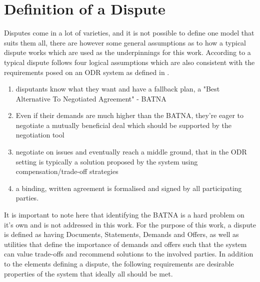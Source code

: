 \documentclass[12pt,msc,a4paper,oneside]{ucl_thesis}
\begin{document}
\section{Definition of a Dispute}
Disputes come in a lot of varieties, and it is not possible to define one model that suits them all, there are however some general assumptions as to how a typical dispute works which are used as the underpinnings for this work. According to \cite{Susskind:Logic_of_mediating_values} a typical dispute follows four logical assumptions which are also consistent with the requirements posed on an ODR system as defined in \cite{Lodder:ORD_system_design}.
\begin{enumerate}
    \item{disputants know what they want and have a fallback plan, a "Best Alternative To Negotiated Agreement" - BATNA}
    \item{Even if their demands are much higher than the BATNA, they're eager to negotiate a mutually beneficial deal which should be supported by the negotiation tool}
    \item{negotiate on issues and eventually reach a middle ground, that in the ODR setting is typically a solution proposed by the system using compensation/trade-off strategies}
    \item{a binding, written agreement is formalised and signed by all participating parties.}
\end{enumerate}
It is important to note here that identifying the BATNA is a hard problem on it's own and is not addressed in this work. For the purpose of this work, a dispute is defined as having Documents, Statements, Demands and Offers, as well as utilities that define the importance of demands and offers such that the system can value trade-offs and recommend solutions to the involved parties. In addition to the elements defining a dispute, the following requirements are desirable properties of the system that ideally all should be met.
\end{document}
